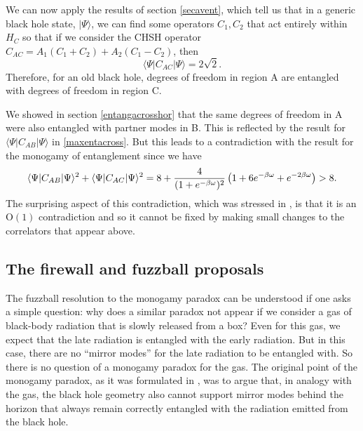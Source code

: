 \documentclass[12pt]{article}
\def\Or[#1]{{\text{O}}\left({#1}\right)}
\newcommand{\be}{\begin{equation}}
\newcommand{\ee}{\end{equation}}
\begin{document}
We can now apply the results of section \ref{secavent}, which tell us that in a generic black hole state, $|\Psi \rangle$, we can find some operators $C_1, C_2$ that act entirely within $H_C$ 
so that if we consider the CHSH operator $C_{AC} = A_1 (C_1 + C_2) + A_2(C_1 - C_2)$, then 
\be
\langle \Psi | C_{AC} | \Psi \rangle = 2 \sqrt{2}.
\ee
Therefore, for an old black hole, degrees of freedom in region A are entangled with degrees of freedom in region C.


We showed in section \ref{entangacrosshor} that the same degrees of freedom in A were also entangled with partner modes in B. This is reflected by the result for $\langle \Psi | C_{AB} | \Psi \rangle$ in  \eqref{maxentacross}. But this leads to a contradiction with the result for the monogamy of entanglement since we have
\be
\langle \Psi | C_{AB} | \Psi \rangle^2 + \langle \Psi | C_{AC} | \Psi \rangle^2 = 8 + {4 \over (1 + e^{-\beta \omega})^2} \left(1 + 6 e^{-{\beta \omega}} + e^{-2{\beta \omega}} \right) > 8.
\ee
The surprising aspect of this contradiction, which was stressed in \cite{Mathur:2009hf}, is that it is an $\Or[1]$ contradiction and so it cannot be fixed by making small changes to the correlators that appear above. 




































\subsection{The firewall and fuzzball proposals}

The fuzzball resolution to the monogamy paradox can be understood if one asks a simple question: why does a similar paradox not appear if we consider a gas of black-body radiation that is slowly released from a box?  Even for this gas, we expect that the late radiation is entangled with the early radiation. But in this case, there are no ``mirror modes'' for the late radiation to be entangled with. So there is no question of a monogamy paradox for the gas. The original point of the  monogamy paradox, as it  was formulated in \cite{Mathur:2009hf}, was to argue that, in analogy with the gas, the black hole geometry also cannot support mirror modes behind the horizon that always remain correctly entangled with the
radiation emitted from the black hole.
\end{document}
